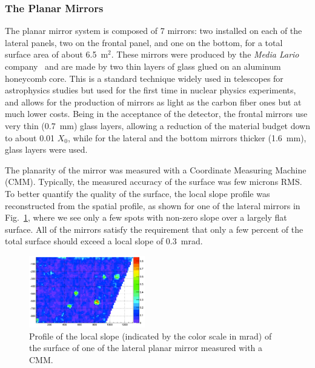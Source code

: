 \documentclass[5p,times,twocolumn]{elsarticle}
\begin{document}
\subsubsection{The Planar Mirrors}

The planar mirror system is composed of 7 mirrors: two installed on each of the lateral panels, two on the frontal panel,
and one on the bottom, for a total surface area of about 6.5~m$^2$. These mirrors were produced by the {\it Media
Lario} company~\cite{REF:MediaLario} and are made by two thin layers of glass glued on an aluminum honeycomb core.
This is a standard technique widely used in telescopes for astrophysics studies but used for the first time in nuclear
physics experiments, and allows for the production of mirrors as light as the carbon fiber ones but at much lower costs.
Being in the acceptance of the detector, the frontal mirrors use very thin (0.7~mm) glass layers, allowing a reduction of
the material budget down to about 0.01 $X_0$, while for the lateral and the bottom mirrors thicker (1.6~mm), glass
layers were used.

The planarity of the mirror was measured with a Coordinate Measuring Machine (CMM). Typically, the measured
accuracy of the surface was few microns RMS. To better quantify the quality of the surface, the local slope profile
was reconstructed from the spatial profile, as shown for one of the lateral mirrors in Fig.~\ref{Fig:SlopeML}, where
we see only a few spots with non-zero slope over a largely flat surface. All of the mirrors satisfy the requirement that
only a few percent of the total surface should exceed a local slope of 0.3~mrad.

\begin{figure}
\begin{center}
\includegraphics[width=0.45\textwidth]{SlopeML.pdf}
\caption{Profile of the local slope (indicated by the color scale in mrad) of the surface of one of the lateral planar
  mirror measured with a CMM.}
\label{Fig:SlopeML}
\end{center}
\end{figure}
\end{document}

